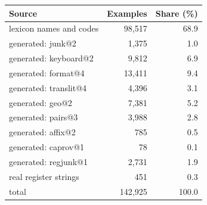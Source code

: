 \begin{tabular}{lrr}
\toprule
Source & Examples & Share (\%) \\
\midrule
lexicon names and codes & 98{,}517 & 68.9 \\
generated: junk@2 & 1{,}375 & 1.0 \\
generated: keyboard@2 & 9{,}812 & 6.9 \\
generated: format@4 & 13{,}411 & 9.4 \\
generated: translit@4 & 4{,}396 & 3.1 \\
generated: geo@2 & 7{,}381 & 5.2 \\
generated: pairs@3 & 3{,}988 & 2.8 \\
generated: affix@2 & 785 & 0.5 \\
generated: caprov@1 & 78 & 0.1 \\
generated: regjunk@1 & 2{,}731 & 1.9 \\
real register strings & 451 & 0.3 \\
\midrule
total & 142{,}925 & 100.0 \\
\bottomrule
\end{tabular}
